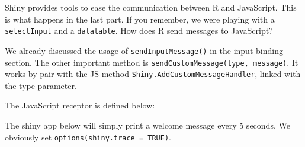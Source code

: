 \documentclass[]{book}
\newenvironment{Shaded}{\begin{snugshade}}{\end{snugshade}}
\newcommand{\AttributeTok}[1]{\textcolor[rgb]{0.77,0.63,0.00}{#1}}
\newcommand{\ControlFlowTok}[1]{\textcolor[rgb]{0.13,0.29,0.53}{\textbf{#1}}}
\newcommand{\DataTypeTok}[1]{\textcolor[rgb]{0.13,0.29,0.53}{#1}}
\newcommand{\KeywordTok}[1]{\textcolor[rgb]{0.13,0.29,0.53}{\textbf{#1}}}
\newcommand{\NormalTok}[1]{#1}
\newcommand{\OperatorTok}[1]{\textcolor[rgb]{0.81,0.36,0.00}{\textbf{#1}}}
\newcommand{\SpecialCharTok}[1]{\textcolor[rgb]{0.00,0.00,0.00}{#1}}
\newcommand{\StringTok}[1]{\textcolor[rgb]{0.31,0.60,0.02}{#1}}
\newcommand{\VariableTok}[1]{\textcolor[rgb]{0.00,0.00,0.00}{#1}}
\newcommand{\VerbatimStringTok}[1]{\textcolor[rgb]{0.31,0.60,0.02}{#1}}
\begin{document}
Shiny provides tools to ease the communication between R and JavaScript. This is what happens in the last part. If you remember, we were playing with a \texttt{selectInput} and a \texttt{datatable}. How does R send messages to JavaScript?

We already discussed the usage of \texttt{sendInputMessage()} in the input binding section. The other important method is \texttt{sendCustomMessage(type,\ message)}. It works by pair with the JS method \texttt{Shiny.AddCustomMessageHandler}, linked with the type parameter.

\begin{Shaded}
\end{Shaded}

The JavaScript receptor is defined below:

\begin{Shaded}
\end{Shaded}

The shiny app below will simply print a welcome message every 5 seconds. We obviously set \texttt{options(shiny.trace\ =\ TRUE)}.
\end{document}
